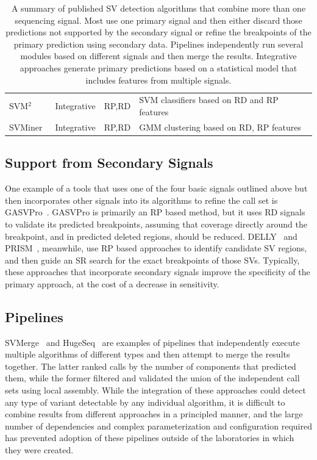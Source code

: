 \begin{table}
\begin{center}
{\begin{tabular}{llll}
SVM$^2$~\cite{Chiara:2012ey}    &       Integrative     &       RP,RD   &       SVM classifiers based on RD and RP features \\
SVMiner~\cite{Hayes:2012ia}	&	Integrative	&	RP,RD	&	GMM clustering based on RD, RP features	\\
\hline
\end{tabular}
}
\end{center}
\caption{A summary of published SV detection algorithms that combine more than one sequencing signal. Most use one primary signal and then either discard those predictions not supported by the secondary signal or refine the breakpoints of the primary prediction using secondary data. Pipelines independently run several modules based on different signals and then merge the results. Integrative approaches generate primary predictions based on a statistical model that includes features from multiple signals.}
\label{table_hybrid_sv_approaches}
\end{table}

\subsection{Support from Secondary Signals}

One example of a tools that uses one of the four basic signals outlined above but then incorporates other signals into its algorithms to refine the call set is GASVPro~\cite{Sindi:2012kk}. GASVPro is primarily an RP based method, but it uses RD signals to validate its predicted breakpoints, assuming that coverage directly around the breakpoint, and in predicted deleted regions, should be reduced. DELLY~\cite{Rausch:2012he} and PRISM~\cite{Jiang:2012cp}, meanwhile, use RP based approaches to identify candidate SV regions, and then guide an SR search for the exact breakpoints of those SVs. Typically, these approaches that incorporate secondary signals improve the specificity of the primary approach, at the cost of a decrease in sensitivity.
 
\subsection{Pipelines}

SVMerge~\cite{Wong:2010p1271} and HugeSeq~\cite{Lam:2012jy} are examples of pipelines that independently execute multiple algorithms of different types and then attempt to merge the results together. The latter ranked calls by the number of components that predicted them, while the former filtered and validated the union of the independent call sets using local assembly. While the integration of these approaches could detect any type of variant detectable by any individual algorithm, it is difficult to combine results from different approaches in a principled manner, and the large number of dependencies and complex parameterization and configuration required has prevented adoption of these pipelines outside of the laboratories in which they were created.


